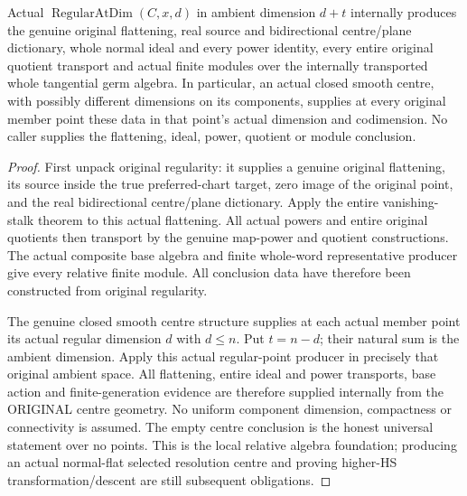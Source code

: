 \begin{theorem}
\label{hir:smooth-centre-actual-closed-centre-relative-consumer}
\leanok
Actual $\operatorname{RegularAtDim}(C,x,d)$ in ambient dimension $d+t$
internally produces the genuine original flattening, real source and
bidirectional centre/plane dictionary, whole normal ideal and every power
identity, every entire original quotient transport and actual finite modules
over the internally transported whole tangential germ algebra. In particular,
an actual closed smooth centre, with possibly different dimensions on its
components, supplies at every original member point these data in that point's
actual dimension and codimension. No caller supplies the flattening, ideal,
power, quotient or module conclusion.
\end{theorem}
\begin{proof}
First unpack original regularity: it supplies a genuine original
flattening, its source inside the true preferred-chart target, zero image of
the original point, and the real bidirectional centre/plane dictionary. Apply
the entire vanishing-stalk theorem to this actual flattening. All actual
powers and entire original quotients then transport by the genuine
map-power and quotient constructions. The actual composite base algebra and
finite whole-word representative producer give every relative finite module.
All conclusion data have therefore been constructed from original regularity.

The genuine closed smooth centre structure supplies at each actual member
point its actual regular dimension $d$ with $d\leq n$. Put $t=n-d$; their
natural sum is the ambient dimension. Apply this actual regular-point
producer in precisely that original ambient space. All flattening, entire
ideal and power transports, base action and finite-generation evidence are
therefore supplied internally from the ORIGINAL centre geometry. No uniform
component dimension, compactness or connectivity is assumed. The empty
centre conclusion is the honest universal statement over no points. This
is the local relative algebra foundation; producing an actual normal-flat
selected resolution centre and proving higher-HS transformation/descent are
still subsequent obligations.
\end{proof}
